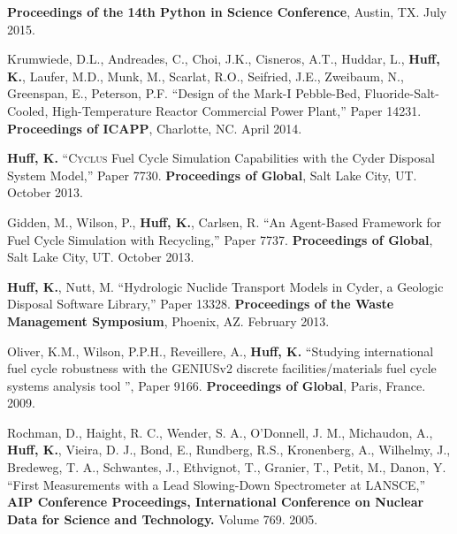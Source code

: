 \documentclass[margin,line]{resume}
\newcommand{\Cyclus}{\textsc{Cyclus}\xspace}%
\begin{document}
\begin{resume}
\begin{bibenum}
         \textbf{Proceedings of the 14th Python in Science Conference}, Austin,
         TX. July 2015.
      \item Krumwiede, D.L., Andreades, C., Choi, J.K., Cisneros, A.T., Huddar, L.,
         \textbf{Huff, K.}, Laufer, M.D., Munk, M., Scarlat, R.O., Seifried, J.E.,
         Zweibaum, N., Greenspan, E., Peterson, P.F.  ``Design of the Mark-I
         Pebble-Bed, Fluoride-Salt-Cooled, High-Temperature Reactor Commercial Power
         Plant,'' Paper 14231.  \textbf{Proceedings of ICAPP}, Charlotte, NC. April 2014.
      \item \textbf{Huff, K.} ``\Cyclus Fuel Cycle Simulation Capabilities with the Cyder Disposal System Model,'' Paper 7730.
         \textbf{Proceedings of Global}, Salt Lake City, UT. October 2013.
      \item Gidden, M., Wilson, P., \textbf{Huff, K.}, Carlsen, R. ``An Agent-Based Framework for Fuel Cycle Simulation with Recycling,'' Paper 7737.
         \textbf{Proceedings of Global}, Salt Lake City, UT. October 2013.
      \item \textbf{Huff, K.}, Nutt, M. ``Hydrologic Nuclide Transport Models in Cyder, a Geologic Disposal Software Library,'' Paper 13328.
         \textbf{Proceedings of the Waste Management Symposium}, Phoenix, AZ.  February 2013.
      \item Oliver, K.M., Wilson, P.P.H., Reveillere, A., \textbf{Huff, K.} ``Studying international fuel cycle robustness with the GENIUSv2 discrete
          facilities/materials fuel cycle systems analysis tool	'', Paper 9166.
          \textbf{Proceedings of Global}, Paris, France. 2009.
      \item Rochman, D., Haight, R. C., Wender, S. A., O'Donnell, J. M.,
        Michaudon, A., \textbf{Huff, K.}, Vieira, D. J., Bond, E., Rundberg, R.S.,
        Kronenberg, A., Wilhelmy, J., Bredeweg, T. A., Schwantes, J., Ethvignot, T.,
        Granier, T., Petit, M., Danon, Y.
        ``First Measurements with a Lead Slowing-Down Spectrometer at LANSCE,''
        \textbf{AIP Conference Proceedings, International Conference on Nuclear
        Data for Science and Technology.} Volume 769. 2005.
    \end{bibenum}

\end{resume}
\end{document}
